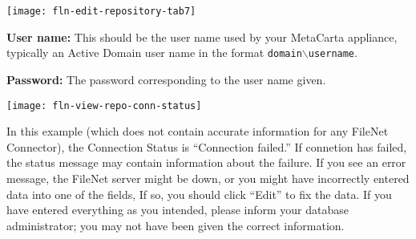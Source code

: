 \texttt{[image: fln-edit-repository-tab7]}

\item \textbf{User name:} This should be the user name used by your MetaCarta appliance, typically an Active Domain user name in the format \texttt{domain$\backslash$username}.

\item \textbf{Password:} The password corresponding to the user name given.



\texttt{[image: fln-view-repo-conn-status]}

In this example (which does not contain accurate information for any
FileNet Connector), the Connection Status is ``Connection failed.''
If connetion has failed, the status message may contain information about
the failure.  If you see an error message, the FileNet server might be
down, or you might have incorrectly entered data into one of the fields,
If so, you should click ``Edit'' to fix the data. If you have entered
everything as you intended, please inform your database administrator;
you may not have been given the correct information.
